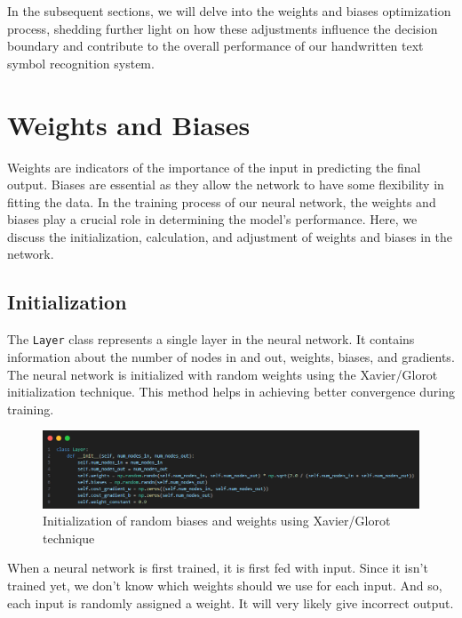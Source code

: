 \documentclass{article}
\begin{document}
In the subsequent sections, we will delve into the weights and biases optimization process, shedding further light on how these adjustments influence the decision boundary and contribute to the overall performance of our handwritten text symbol recognition system.

\newpage
\section{Weights and Biases}
Weights are indicators of the importance of the input in predicting the final output. Biases are essential as they allow the network to have some flexibility in fitting the data. In the training process of our neural network, the weights and biases play a crucial role in determining the model's performance. Here, we discuss the initialization, calculation, and adjustment of weights and biases in the network. 

\subsection{Initialization}
The \texttt{Layer} class represents a single layer in the neural network. It contains information about the number of nodes in and out, weights, biases, and gradients. The neural network is initialized with random weights using the Xavier/Glorot initialization technique. This method helps in achieving better convergence during training.

\begin{figure}[ht]
    \centering 
    \includegraphics[width=1\textwidth]{images/Xavier-Glorot-initialization-for-weights.png}
    \caption{Initialization of random biases and weights using Xavier/Glorot technique}
    \label{fig:initialized_weights}
\end{figure}

When a neural network is first trained, it is first fed with input. Since it isn't trained yet, we don't know which weights should we use for each input. And so, each input is randomly assigned a weight. It will very likely give incorrect output.
\end{document}
